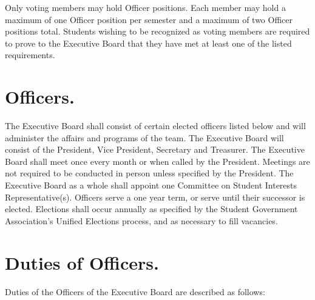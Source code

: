 \documentclass[12pt]{constitution}
\begin{document}

Only voting members may hold Officer positions. Each member may hold a maximum
of one Officer position per semester and a maximum of two Officer positions
total. Students wishing to be recognized as voting members are required to prove
to the Executive Board that they have met at least one of the listed
requirements.

\label{art:EXECUTIVE-BOARD}

\section{Officers.}\label{art:OFFICERS}

The Executive Board shall consist of certain elected officers listed below and
will administer the affairs and programs of the team. The Executive Board will
consist of the President, Vice President, Secretary and Treasurer. The Executive
Board shall meet once every month or when called by the President. Meetings are
not required to be conducted in person unless specified by the President. The
Executive Board as a whole shall appoint one Committee on Student Interests
Representative(s). Officers serve a one year term, or serve until their
successor is elected. Elections shall occur annually as specified by the Student
Government Association’s Unified Elections process, and as necessary to fill
vacancies.

\section{Duties of Officers.}\label{sec:DUTIES}

Duties of the Officers of the Executive Board are described as follows:
\end{document}
